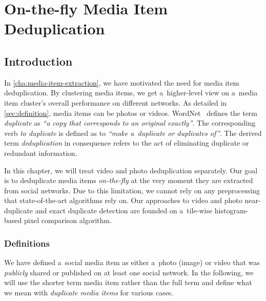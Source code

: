 \chapter{On-the-fly Media Item Deduplication}
\label{cha:media-item-deduplication}

\ifpdf
    \graphicspath{{7_media_item_deduplication/figures/PNG/}{7_media_item_deduplication/figures/PDF/}{7_media_item_deduplication/figures/}}
\else
    \graphicspath{{7_media_item_deduplication/figures/EPS/}{7_media_item_deduplication/figures/}}
\fi

\section{Introduction}

In \autoref{cha:media-item-extraction},
we have motivated the need for media item deduplication.
By clustering media items, we get a~higher-level view on
a~media item cluster's overall performance on different networks.
As detailed in \autoref{sec:definition}, media items can be
photos or videos.
WordNet~\cite{fellbaum1998wordnet,miller1995wordnet} defines
the term \emph{duplicate} as
\textit{``a copy that corresponds to an original exactly''}.
The corresponding verb \emph{to duplicate} is defined as to
\textit{``make a~duplicate or duplicates of''}.
The derived term \emph{deduplication} in consequence refers to
the act of eliminating duplicate or redundant information.

In this chapter, we will treat video
and photo deduplication separately. 
Our goal is to deduplicate media items \emph{on-the-fly}
at the very moment they are extracted from social networks.
Due to this limitation, we cannot rely on any preprocessing
that state-of-the-art algorithms rely on.
Our approaches to video and photo near-duplicate
and exact duplicate detection are founded
on a~tile-wise histogram-based pixel comparison algorithm.

\subsection{Definitions}

We have defined a~social media item as either a~photo (image) or video
that was \emph{publicly} shared or published
on at least one social network.
In the following, we will use the shorter term media item
rather than the full term and define
what we mean with \emph{duplicate media items} for various cases.

